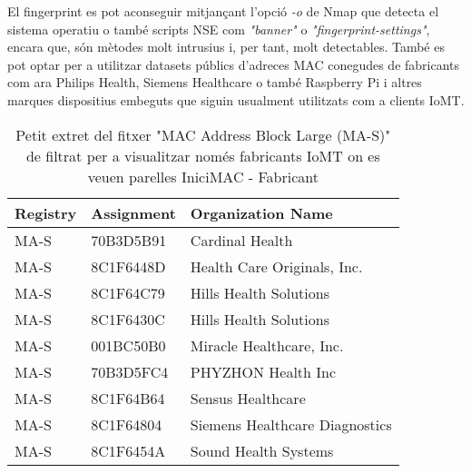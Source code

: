 El fingerprint es pot aconseguir mitjançant l'opció \textit{-o} de Nmap que detecta el sistema operatiu o també scripts NSE com \textit{"banner"} o \textit{"fingerprint-settings"}, encara que, són mètodes molt intrusius i, per tant, molt detectables. També es pot optar per a utilitzar datasets públics d'adreces MAC conegudes de fabricants com ara Philips Health, Siemens Healthcare o també Raspberry Pi i altres marques dispositius embeguts que siguin usualment utilitzats com a clients IoMT.

\begin{table}[H]
\centering
\begin{tabular}{@{}lll@{}}
\toprule
\textbf{Registry} & \textbf{Assignment} & \textbf{Organization Name} \\
\midrule
MA-S & 70B3D5B91 & Cardinal Health \\
MA-S & 8C1F6448D & Health Care Originals, Inc. \\
MA-S & 8C1F64C79 & Hills Health Solutions \\
MA-S & 8C1F6430C & Hills Health Solutions \\
MA-S & 001BC50B0 & Miracle Healthcare, Inc. \\
MA-S & 70B3D5FC4 & PHYZHON Health Inc \\
MA-S & 8C1F64B64 & Sensus Healthcare \\
MA-S & 8C1F64804 & Siemens Healthcare Diagnostics \\
MA-S & 8C1F6454A & Sound Health Systems \\
\bottomrule
\end{tabular}
\caption{Petit extret del fitxer "MAC Address Block Large (MA-S)" de \cite{iotmaclist} filtrat per a visualitzar només fabricants IoMT on es veuen parelles IniciMAC - Fabricant}  %
\label{fig:iot_manufacturers}
\end{table}
